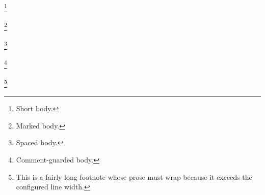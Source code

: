 \footnote{Short body.}

\footnote[7]{Marked body.}

\footnote{Spaced body.}

\footnote%
{Comment-guarded body.}

\footnote{This is a fairly long footnote
whose prose must wrap because it exceeds
the configured line width.}
